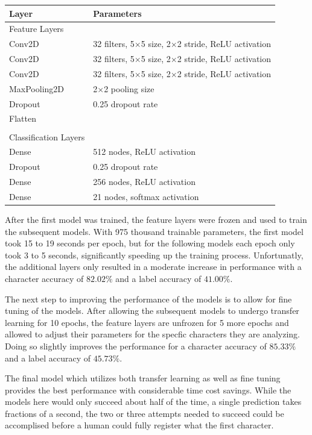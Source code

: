 \documentclass[12pt]{article}
\begin{document}
\begin{tabular}{ll}
    \toprule
	Layer        & Parameters \\
	\midrule
	Feature Layers \\
	Conv2D       & 32 filters, 5$\times$5 size, 2$\times$2 stride, ReLU
		activation  \\
	Conv2D       & 32 filters, 5$\times$5 size, 2$\times$2 stride, ReLU
		activation  \\
	Conv2D       & 32 filters, 5$\times$5 size, 2$\times$2 stride, ReLU
		activation  \\
	MaxPooling2D & 2$\times$2 pooling size  \\
	Dropout      & 0.25 dropout rate \\
	Flatten      &   \\
	\\
	Classification Layers \\
	Dense        & 512 nodes, ReLU activation \\
	Dropout      & 0.25 dropout rate \\
	Dense        & 256 nodes, ReLU activation \\
	Dense        & 21 nodes, softmax activation \\
	\bottomrule
\end{tabular}

After the first model was trained, the feature layers were frozen and used to
train the subsequent models. With 975 thousand trainable parameters, the first
model took 15 to 19 seconds per epoch, but for the following models each epoch
only took 3 to 5 seconds, significantly speeding up the training process.
Unfortunatly, the additional layers only resulted in a moderate increase in
performance with a character accuracy of $82.02\%$ and a label accuracy of
$41.00\%$. 

The next step to improving the performance of the models is to allow for fine
tuning of the models. After allowing the subsequent models to undergo transfer
learning for 10 epochs, the feature layers are unfrozen for 5 more epochs and
allowed to adjust their parameters for the specfic characters they are 
analyzing. Doing so slightly improves the performance for a character accuracy
of $85.33\%$ and a label accuracy of $45.73\%$. 


The final model which utilizes both transfer learning as well as fine tuning
provides the best performance with considerable time cost savings. While the
models here would only succeed about half of the time, a single prediction takes
fractions of a second, the two or three attempts needed to succeed could be
accomplised before a human could fully register what the first character.
\end{document}
